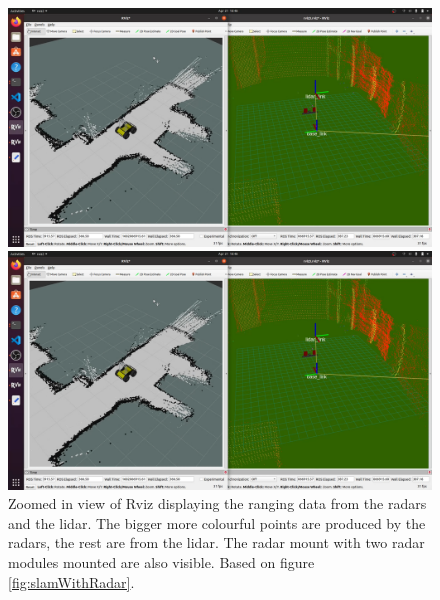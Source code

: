 \begin{figure}[H]
    \centering
    \begin{minipage}[b]{0.49\textwidth}
        \includegraphics[width=\textwidth,trim={7cm 4cm 25cm 7cm},clip]{Figures/slamWithRadar.png}
        \caption{Zoomed in view of Rviz2 showing the Husky in a map produced by SLAM. Small dots around the black areas represent merged range data from ROS1 (seen in figure \ref{fig:slamWithRadarRos1}). Based on figure \ref{fig:slamWithRadar}.}
        \label{fig:slamWithRadarRos2}
    \end{minipage}
    \begin{minipage}[b]{0.49\textwidth}
        \includegraphics[width=\textwidth,trim={25cm 7cm 7cm 4cm},clip]{Figures/slamWithRadar.png}
        \caption{Zoomed in view of Rviz displaying the ranging data from the radars and the lidar. The bigger more colourful points are produced by the radars, the rest are from the lidar. The radar mount with two radar modules mounted are also visible. Based on figure \ref{fig:slamWithRadar}.}
        \label{fig:slamWithRadarRos1}
    \end{minipage}
\end{figure}

